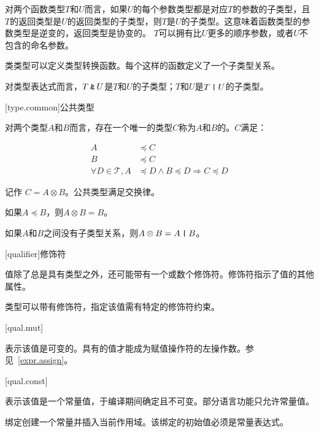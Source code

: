 \pnum
对两个函数类型$T$和$U$而言，如果$U$的每个参数类型都是对应$T$的参数的子类型，且$T$的返回类型是$U$的返回类型的子类型，则$T$是$U$的子类型。\enternote 这意味着函数类型的参数类型是逆变的，返回类型是协变的。 \exitnote $T$可以拥有比$U$更多的顺序参数，或者$U$不包含的命名参数。

\pnum
类类型可以定义类型转换函数。每个这样的函数定义了一个子类型关系。

\pnum
对类型表达式而言，$T\mathbin{\texttt{\&}}U$是$T$和$U$的子类型；$T$和$U$是$T\mathbin{\texttt{|}}U$的子类型。

[type.common]{公共类型}

\pnum
对两个类型$A$和$B$而言，存在一个唯一的类型$C$称为$A$和$B$的。$C$满足：

\begin{equation}
\begin{aligned}
    A &\preceq C \\
    B &\preceq C \\
    \forall D \in \mathcal{T}, A &\preceq D \land B \preceq D \Rightarrow C \preceq D
\end{aligned}
\end{equation}

记作 $C = A \otimes B$。公共类型满足交换律。

\pnum
如果$A \preceq B$，则$A \otimes B = B$。

\pnum
如果$A$和$B$之间没有子类型关系，则$A \otimes B = A \mathbin{\texttt{|}} B$。

[qualifier]{修饰符}

\pnum
值除了总是具有类型之外，还可能带有一个或数个修饰符。修饰符指示了值的其他属性。

\pnum
类型可以带有修饰符，指定该值需有特定的修饰符约束。

[qual.mut]{}

\pnum
{}表示该值是可变的。具有的值才能成为赋值操作符的左操作数。参见~\ref{expr.assign}。

[qual.const]{}

\pnum
{}表示该值是一个常量值，于编译期间确定且不可变。部分语言功能只允许常量值。

\pnum
{}绑定创建一个常量并插入当前作用域。该绑定的初始值必须是常量表达式。
